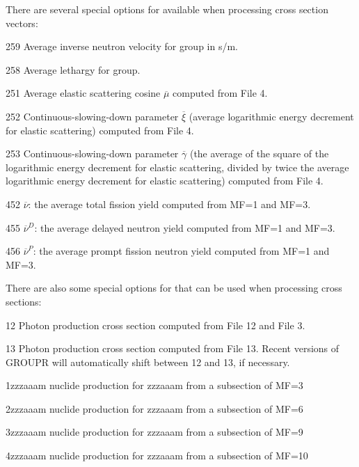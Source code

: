 There are several special options for  available when processing
cross section vectors:

\begin{list}{ }{=.25in\leftmargin=1in=.75in}
\begin{singlespace}
\item[\underbar{\cword{mtd}}] 
\item[259] Average inverse neutron velocity for group in s/m.
\item[258] Average lethargy for group.
\item[251] Average elastic scattering cosine $\overline\mu$
               computed from File 4.
\item[252] Continuous-slowing-down parameter $\overline\xi$
               (average logarithmic energy decrement for elastic
               scattering) computed from File 4.
\item[253] Continuous-slowing-down parameter $\overline\gamma$
               (the average of the square of the logarithmic energy
               decrement for elastic scattering, divided by twice the
               average logarithmic energy decrement for elastic
               scattering) computed from File 4.
\item[452] $\overline\nu$: the average total fission yield
               computed from MF=1 and MF=3.
\item[455] $\overline\nu^D$: the average delayed neutron yield
               computed from MF=1 and MF=3.
\item[456] $\overline\nu^P$: the average prompt fission neutron
               yield computed from MF=1 and MF=3.
\end{singlespace}
\end{list}

\noindent
There are also some special options for  that can
be used when processing cross sections:

\begin{list}{ }{=.25in\leftmargin=1in=.75in}
\begin{singlespace}

\item[\underbar{\cword{mfd}}] 
\item[12] Photon production cross section computed from File 12 and File 3.
\item[13] Photon production cross section computed from File 13.
          Recent versions of GROUPR will automatically shift
          between 12 and 13, if necessary.
\item[1zzzaaam] nuclide production for zzzaaam from a subsection of MF=3
\item[2zzzaaam] nuclide production for zzzaaam from a subsection of MF=6
\item[3zzzaaam] nuclide production for zzzaaam from a subsection of MF=9
\item[4zzzaaam] nuclide production for zzzaaam from a subsection of MF=10
\end{singlespace}
\end{list}

